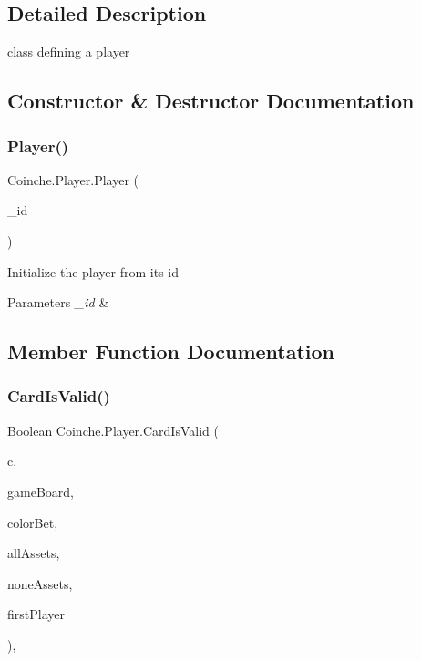 \subsection{Detailed Description}
class defining a player 



\subsection{Constructor \& Destructor Documentation}
\mbox{\label{class_coinche_1_1_player_a2111dfa81103a51e186b77dd90b73c22}} 
\subsubsection{\texorpdfstring{Player()}{Player()}}
{\footnotesize\ttfamily Coinche.\+Player.\+Player (\begin{DoxyParamCaption}\item[{int}]{\+\_\+id }\end{DoxyParamCaption})\hspace{0.3cm}{\ttfamily [inline]}}



Initialize the player from its id 


\begin{DoxyParams}{Parameters}
{\em \+\_\+id} & \\
\hline
\end{DoxyParams}


\subsection{Member Function Documentation}
\mbox{\label{class_coinche_1_1_player_adfb688665d8b3e6493e4832d32fbaf1d}} 
\subsubsection{\texorpdfstring{Card\+Is\+Valid()}{CardIsValid()}}
{\footnotesize\ttfamily Boolean Coinche.\+Player.\+Card\+Is\+Valid (\begin{DoxyParamCaption}\item[{\hyperlink{class_coinche_1_1_card}{Card}}]{c,  }\item[{\hyperlink{class_coinche_1_1_card}{Card} \mbox{[}$\,$\mbox{]}}]{game\+Board,  }\item[{Card\+Color}]{color\+Bet,  }\item[{Boolean}]{all\+Assets,  }\item[{Boolean}]{none\+Assets,  }\item[{int}]{first\+Player }\end{DoxyParamCaption})\hspace{0.3cm}{\ttfamily [inline]}, {\ttfamily [private]}}



